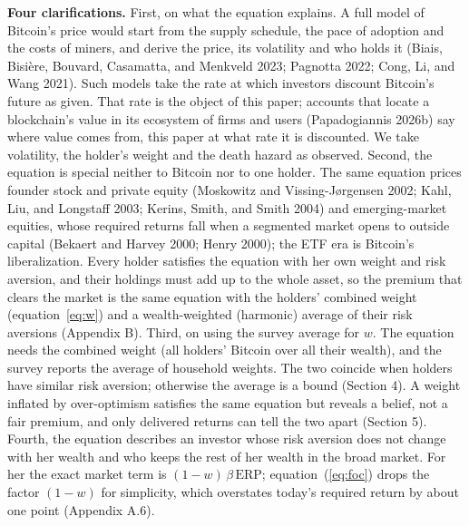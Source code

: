 \documentclass[11pt]{article}
\begin{document}
\textbf{Four clarifications.} First, on what the equation explains. A full model of Bitcoin's price would start from the supply schedule, the pace of adoption and the costs of miners, and derive the price, its volatility and who holds it (Biais, Bisi\`ere, Bouvard, Casamatta, and Menkveld 2023; Pagnotta 2022; Cong, Li, and Wang 2021). Such models take the rate at which investors discount Bitcoin's future as given. That rate is the object of this paper; accounts that locate a blockchain's value in its ecosystem of firms and users (Papadogiannis 2026b) say where value comes from, this paper at what rate it is discounted. We take volatility, the holder's weight and the death hazard as observed. Second, the equation is special neither to Bitcoin nor to one holder. The same equation prices founder stock and private equity (Moskowitz and Vissing-J\o rgensen 2002; Kahl, Liu, and Longstaff 2003; Kerins, Smith, and Smith 2004) and emerging-market equities, whose required returns fall when a segmented market opens to outside capital (Bekaert and Harvey 2000; Henry 2000); the ETF era is Bitcoin's liberalization. Every holder satisfies the equation with her own weight and risk aversion, and their holdings must add up to the whole asset, so the premium that clears the market is the same equation with the holders' combined weight (equation~\ref{eq:w}) and a wealth-weighted (harmonic) average of their risk aversions (Appendix B). Third, on using the survey average for $w$. The equation needs the combined weight (all holders' Bitcoin over all their wealth), and the survey reports the average of household weights. The two coincide when holders have similar risk aversion; otherwise the average is a bound (Section 4). A weight inflated by over-optimism satisfies the same equation but reveals a belief, not a fair premium, and only delivered returns can tell the two apart (Section 5). Fourth, the equation describes an investor whose risk aversion does not change with her wealth and who keeps the rest of her wealth in the broad market. For her the exact market term is $(1-w)\,\beta\,\mathrm{ERP}$; equation~(\ref{eq:foc}) drops the factor $(1-w)$ for simplicity, which overstates today's required return by about one point (Appendix A.6).
\end{document}
